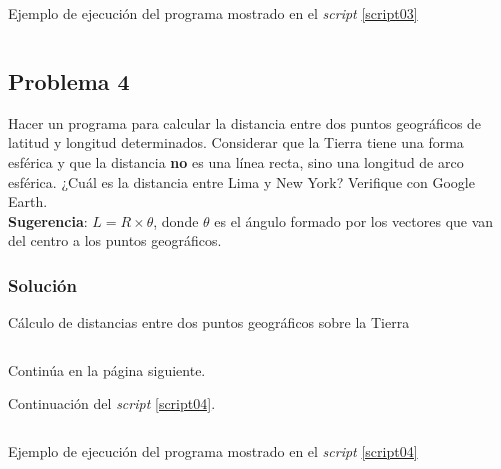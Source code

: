\documentclass[a4paper,12pt,final]{article}
\begin{document}
      \newpage
      \begin{listing}[H]
        \caption{Ejemplo de ejecución del programa mostrado en el
        \emph{script} \ref{script03}}
        \label{script03sample}
        \inputminted{text}{./laboratorio_1/problema03_sample.txt}
      \end{listing}
      \vspace{\fill}

  \newpage
  \subsection*{Problema 4}
    \noindent Hacer un programa para calcular la distancia entre dos puntos
    geográficos de latitud y longitud determinados. Considerar que la
    Tierra tiene una forma esférica y que la distancia \textbf{no} es una
    línea recta, sino una longitud de arco esférica. ¿Cuál es la distancia
    entre Lima y New York? Verifique con Google Earth.\\

    \noindent\textbf{Sugerencia}: $L=R\times\theta$, donde $\theta$ es el ángulo
    formado por los vectores que van del centro a los puntos geográficos.

    \subsubsection*{Solución}
      \begin{listing}[H]
        \caption{Cálculo de distancias entre dos puntos geográficos sobre la
        Tierra}
        \label{script04}
        \inputminted[firstline=5,lastline=43]{matlab}{./laboratorio_1/problema04.m}
      \end{listing}
      \vspace{-1em}
      \noindent\small{Continúa en la página siguiente.}
      \vspace{\fill}

      \newpage
      \noindent\small{Continuación del \emph{script} \ref{script04}.}
      \vspace{-1em}
      \begin{listing}[H]
        \inputminted[firstline=45]{matlab}{./laboratorio_1/problema04.m}
      \end{listing}

      \begin{listing}[H]
        \caption{Ejemplo de ejecución del programa mostrado en el
        \emph{script} \ref{script04}}
        \label{script04sample}
        \inputminted{text}{./laboratorio_1/problema04_sample.txt}
      \end{listing}
      \vspace{\fill}
\end{document}
